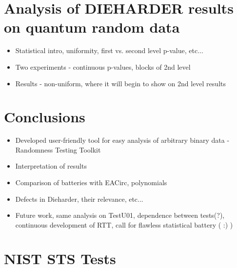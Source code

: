 \documentclass[
  digital,  	%
  color,		%
  oneside,   	%
  12pt,
  nocover,
  notable,
  nolof,
  nolot,
]{fithesis3}
\theoremstyle{definition}
\theoremstyle{remark}
\begin{document}
\chapter{Analysis of DIEHARDER results on quantum random data}
\begin{itemize}
\item Statistical intro, uniformity, first vs. second level p-value, etc...
\item Two experiments - continuous p-values, blocks of 2nd level
\item Results - non-uniform, where it will begin to show on 2nd level results
\end{itemize}

\chapter{Conclusions}
\begin{itemize}
\item Developed user-friendly tool for easy analysis of arbitrary binary data - Randomness Testing Toolkit
\item Interpretation of results
\item Comparison of batteries with EACirc, polynomials
\item Defects in Dieharder, their relevance, etc...
\item Future work, same analysis on TestU01, dependence between tests(?), continuous development of RTT, call for flawless statistical battery ( :) )
\end{itemize}

\appendix

\printbibliography

\chapter{NIST STS Tests}
\label{app:nist_sts_tests}
\end{document}
